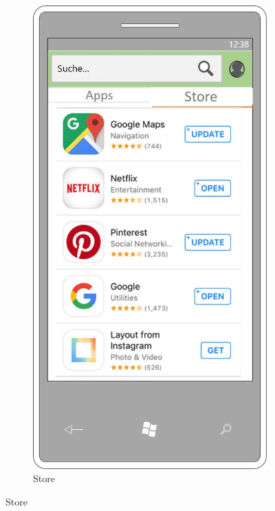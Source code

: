 \begin{figure}[!ht]
	\centering
	\begin{subfigure}{0.32\linewidth}
		\centering
		\includegraphics[width=1\linewidth]{Picture/App-Store}
		\caption{Store}
		\label{fig:prototyp1}
	\end{subfigure}%

\end{figure}
